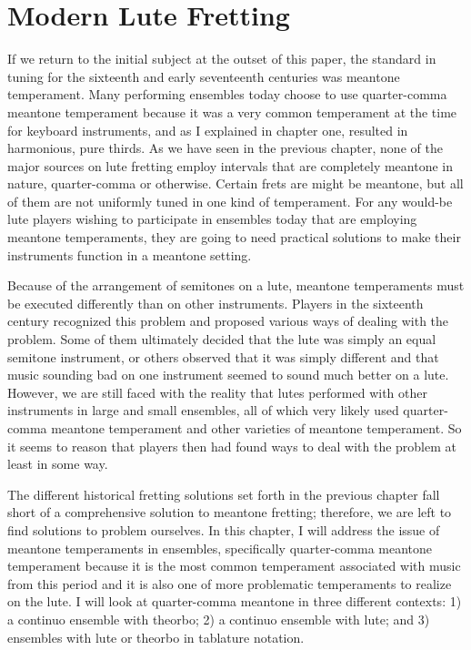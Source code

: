 \chapter{Modern Lute Fretting}

If we return to the initial subject at the outset of this paper, the standard in tuning
for the sixteenth and early seventeenth centuries was meantone temperament.  Many
performing ensembles today choose to use quarter-comma meantone temperament because it
was a very common temperament at the time for keyboard instruments, and as I explained
in chapter one, resulted in harmonious, pure thirds.  As we have seen in the previous
chapter, none of the major sources on lute fretting employ intervals that are
completely meantone in nature, quarter-comma or otherwise.  Certain frets are might be
meantone, but all of them are not uniformly tuned in one kind of temperament.  For any
would-be lute players wishing to participate in ensembles today that are employing
meantone temperaments, they are going to need practical solutions to make their
instruments function in a meantone setting.

Because of the arrangement of semitones on a lute, meantone temperaments must be
executed differently than on other instruments.  Players in the sixteenth century
recognized this problem and proposed various ways of dealing with the problem.  Some of
them ultimately decided that the lute was simply an equal semitone instrument, or
others observed that it was simply different and that music sounding bad on one
instrument seemed to sound much better on a lute.\autocite[45]{ML:1}  However, we are
still faced with the reality that lutes performed with other instruments in large and
small ensembles, all of which very likely used quarter-comma meantone temperament and
other varieties of meantone temperament.  So it seems to reason that players then had
found ways to deal with the problem at least in some way.

The different historical fretting solutions set forth in the previous chapter fall
short of a comprehensive solution to meantone fretting; therefore, we are left to find
solutions to problem ourselves. In this chapter, I will address the
issue of meantone temperaments in ensembles, specifically quarter-comma
meantone temperament because it is the most common temperament associated with music
from this period and it is also one of more problematic temperaments to realize on the
lute. I will look at quarter-comma meantone in three different contexts: 1) a continuo
ensemble with theorbo; 2) a continuo ensemble with lute; and 3) ensembles with lute or
theorbo in tablature notation.


